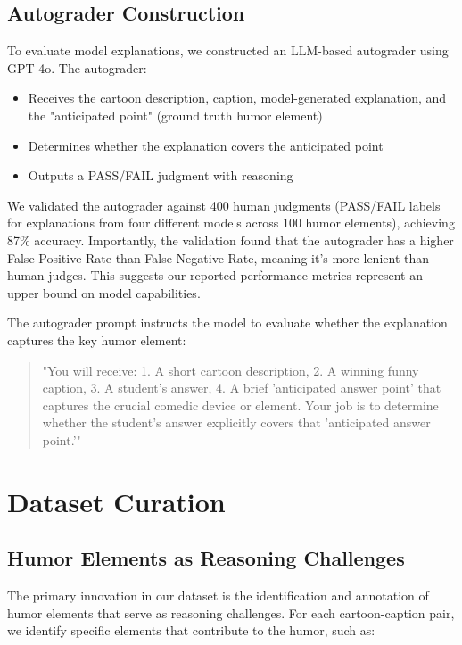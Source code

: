 \documentclass[twocolumn]{article}
\begin{document}
\subsection{Autograder Construction}

To evaluate model explanations, we constructed an LLM-based autograder using GPT-4o. The autograder:
\begin{itemize}
    \item Receives the cartoon description, caption, model-generated explanation, and the "anticipated point" (ground truth humor element)
    \item Determines whether the explanation covers the anticipated point
    \item Outputs a PASS/FAIL judgment with reasoning
\end{itemize}

We validated the autograder against 400 human judgments (PASS/FAIL labels for explanations from four different models across 100 humor elements), achieving 87\% accuracy. Importantly, the validation found that the autograder has a higher False Positive Rate than False Negative Rate, meaning it's more lenient than human judges. This suggests our reported performance metrics represent an upper bound on model capabilities.

The autograder prompt instructs the model to evaluate whether the explanation captures the key humor element:
\begin{quote}
"You will receive: 1. A short cartoon description, 2. A winning funny caption, 3. A student's answer, 4. A brief 'anticipated answer point' that captures the crucial comedic device or element. Your job is to determine whether the student's answer explicitly covers that 'anticipated answer point.'"
\end{quote}


\section{Dataset Curation}

\subsection{Humor Elements as Reasoning Challenges}

The primary innovation in our dataset is the identification and annotation of humor elements that serve as reasoning challenges. For each cartoon-caption pair, we identify specific elements that contribute to the humor, such as:
\end{document}

